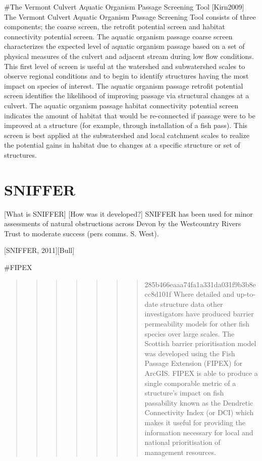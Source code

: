 \documentclass[]{article}
\begin{document}
\#The Vermont Culvert Aquatic Organism Passage Screening Tool
{[}Kirn2009{]} The Vermont Culvert Aquatic Organism Passage Screening
Tool consists of three components; the coarse screen, the retrofit
potential screen and habitat connectivity potential screen. The aquatic
organism passage coarse screen characterizes the expected level of
aquatic organism passage based on a set of physical measures of the
culvert and adjacent stream during low flow conditions. This first level
of screen is useful at the watershed and subwatershed scales to observe
regional conditions and to begin to identify structures having the most
impact on species of interest. The aquatic organism passage retrofit
potential screen identifies the likelihood of improving passage via
structural changes at a culvert. The aquatic organism passage habitat
connectivity potential screen indicates the amount of habitat that would
be re-connected if passage were to be improved at a structure (for
example, through installation of a fish pass). This screen is best
applied at the subwatershed and local catchment scales to realize the
potential gains in habitat due to changes at a specific structure or set
of structures.

\hypertarget{sniffer-1}{%
\section{SNIFFER}\label{sniffer-1}}

{[}What is SNIFFER{]} {[}How was it developed?{]} SNIFFER has been used
for minor assessments of natural obstructions across Devon by the
Westcountry Rivers Trust to moderate success (pers comms. S. West).

{[}SNIFFER, 2011{]}{[}Bull{]}

\#FIPEX

\begin{quote}
\begin{quote}
\begin{quote}
\begin{quote}
\begin{quote}
\begin{quote}
\begin{quote}
285b466eaaa74fa1a331da031f9b3b8ecc8d101f Where detailed and up-to-date
structure data other investigators have produced barrier permeability
models for other fish species over large scales. The Scottish barrier
prioritisation model was developed using the Fish Passage Extension
(FIPEX) for ArcGIS. FIPEX is able to produce a single comporable metric
of a structure's impact on fish passability known as the Dendretic
Connectivity Index (or DCI) which makes it useful for providing the
information necessary for local and national prioritisation of
management resources.
\end{quote}
\end{quote}
\end{quote}
\end{quote}
\end{quote}
\end{quote}
\end{quote}
\end{document}
